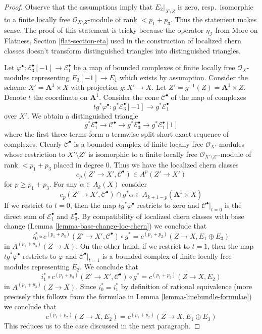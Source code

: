 \begin{proof}
Observe that the assumptions imply that $E_2|_{X \setminus Z}$ is zero,
resp.\ isomorphic to a finite locally free $\mathcal{O}_{X \setminus Z}$-module
of rank $< p_1 + p_3$. Thus the statement makes sense. The proof of this
statement is tricky because the operator $\eta_\mathcal{I}$ from
More on Flatness, Section \ref{flat-section-eta} used in the construction
of localized chern classes doesn't transform distinguished triangles into
distinguished triangles.

\medskip\noindent
Let $\varphi^\bullet : \mathcal{E}_3^\bullet[-1] \to \mathcal{E}_1^\bullet$
be a map of bounded complexes of finite locally free $\mathcal{O}_X$-modules
representing $E_3[-1] \to E_1$ which exists by assumption. Consider the scheme
$X' = \mathbf{A}^1 \times X$ with projection
$g : X' \to X$. Let $Z' = g^{-1}(Z) = \mathbf{A}^1 \times Z$.
Denote $t$ the coordinate on $\mathbf{A}^1$. Consider the cone
$\mathcal{C}^\bullet$ of the map of complexes
$$
t g^*\varphi^\bullet :
g^*\mathcal{E}_3^\bullet[-1]
\longrightarrow
g^*\mathcal{E}_1^\bullet
$$
over $X'$. We obtain a distinguished triangle
$$
g^*\mathcal{E}_1^\bullet \to \mathcal{C}^\bullet \to
g^*\mathcal{E}_3^\bullet \to g^*\mathcal{E}_1^\bullet[1]
$$
where the first three terms form a termwise split short exact
sequence of complexes. Clearly $\mathcal{C}^\bullet$ is a
bounded complex of finite locally free $\mathcal{O}_{X'}$-modules
whose restriction to $X' \setminus Z'$ is isomorphic to a
finite locally free
$\mathcal{O}_{X' \setminus Z'}$-module of rank $< p_1 + p_3$
placed in degree $0$. Thus we have the localized chern classes
$$
c_p(Z' \to X', \mathcal{C}^\bullet) \in A^p(Z' \to X')
$$
for $p \geq p_1 + p_3$. For any $\alpha \in A_k(X)$ consider
$$
c_p(Z' \to X', \mathcal{C}^\bullet) \cap g^*\alpha
\in A_{k + 1 - p}(\mathbf{A}^1 \times X)
$$
If we restrict to $t = 0$, then the map $t g^*\varphi^\bullet$
restricts to zero and $\mathcal{C}^\bullet|_{t = 0}$
is the direct sum of $\mathcal{E}_1^\bullet$ and $\mathcal{E}_3^\bullet$.
By compatibility of localized chern classes with base change
(Lemma \ref{lemma-base-change-loc-chern}) we conclude that
$$
i_0^* \circ c^{(p_1 + p_3)}(Z' \to X', \mathcal{C}^\bullet) \circ g^* =
c^{(p_1 + p_2)}(Z \to X, E_1 \oplus E_3)
$$
in $A^{(p_1 + p_3)}(Z \to X)$. On the other hand, if we restrict to $t = 1$,
then the map $t g^*\varphi^\bullet$
restricts to $\varphi$ and $\mathcal{C}^\bullet|_{t = 1}$
is a bounded complex of finite locally free modules representing $E_2$.
We conclude that
$$
i_1^* \circ c^{(p_1 + p_3)}(Z' \to X', \mathcal{C}^\bullet) \circ g^* =
c^{(p_1 + p_2)}(Z \to X, E_2)
$$
in $A^{(p_1 + p_3)}(Z \to X)$. Since $i_0^* = i_1^*$ by definition of
rational equivalence (more precisely this follows from the formulae in
Lemma \ref{lemma-linebundle-formulae}) we conclude that
$$
c^{(p_1 + p_2)}(Z \to X, E_2) = c^{(p_1 + p_2)}(Z \to X, E_1 \oplus E_3)
$$
This reduces us to the case discussed in the next paragraph.


\end{proof}
